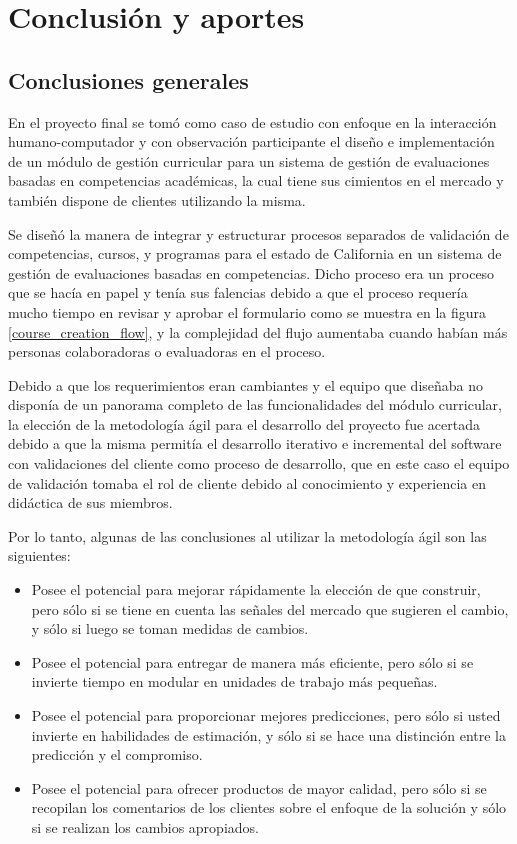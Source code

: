 
\chapter{Conclusión y aportes} \label{capitulo7} 

\section{Conclusiones generales}
En el proyecto final se tomó como caso de estudio con enfoque en la interacción humano-computador y con observación participante el diseño e implementación de un módulo de gestión curricular para un sistema de gestión de evaluaciones basadas en competencias académicas, la cual tiene sus cimientos en el mercado y también dispone de clientes utilizando la misma. 

Se diseñó la manera de integrar y estructurar procesos separados de validación de competencias, cursos, y programas para el estado de California en un sistema de gestión de evaluaciones basadas en competencias. Dicho proceso era un proceso que se hacía en papel y tenía sus falencias debido a que el proceso requería mucho tiempo en revisar y aprobar el formulario como se muestra en la figura \ref{course_creation_flow}, y la complejidad del flujo aumentaba cuando habían más personas colaboradoras o evaluadoras en el proceso.

Debido a que los requerimientos eran cambiantes y el equipo que diseñaba no disponía de un panorama completo de las funcionalidades del módulo curricular, la elección de la metodología ágil para el desarrollo del proyecto fue acertada debido a que la misma permitía el desarrollo iterativo e incremental del software con validaciones del cliente como proceso de desarrollo, que en este caso el equipo de validación tomaba el rol de cliente debido al conocimiento y experiencia en didáctica de sus miembros.

Por lo tanto, algunas de las conclusiones al utilizar la metodología ágil son las siguientes:
\begin{itemize}
	\item Posee el potencial para mejorar rápidamente la elección de que construir, pero sólo si se tiene en cuenta las señales del mercado que sugieren el cambio, y sólo si luego se toman medidas de cambios.
	\item Posee el potencial para entregar de manera más eficiente, pero sólo si se invierte tiempo en modular en unidades de trabajo más pequeñas. 
	\item Posee el potencial para proporcionar mejores predicciones, pero sólo si usted invierte en habilidades de estimación, y sólo si se hace una distinción entre la predicción y el compromiso.
	\item Posee el potencial para ofrecer productos de mayor calidad, pero sólo si se recopilan los comentarios de los clientes sobre el enfoque de la solución y sólo si se realizan los cambios apropiados.
\end{itemize}

